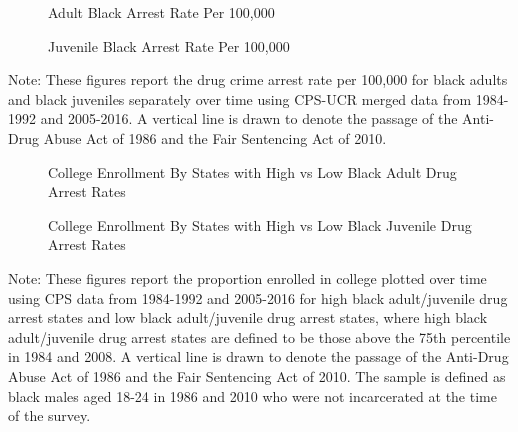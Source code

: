 
   \begin{figure}[h]
    \centering
    \caption{Adult Black Arrest Rate Per 100,000}%
    \qquad
    \label{fig:raw_ab}%
  \end{figure}
  \begin{figure}[h]
    \centering
    \caption{Juvenile Black Arrest Rate Per 100,000}%
    \qquad
    \label{fig:raw_jb}%
  \end{figure}

  \begin{footnotesize}
    \noindent Note: These figures report the drug crime arrest rate per 100,000 for black adults and black juveniles separately over time using CPS-UCR merged data from 1984-1992 and 2005-2016. A vertical line is drawn to denote the passage of the Anti-Drug Abuse Act of 1986 and the Fair Sentencing Act of 2010.
  \end{footnotesize}
  
  \clearpage
  

  \begin{figure}[h]
    \centering
    \caption{College Enrollment By States with High vs Low Black Adult Drug Arrest Rates}%
    \qquad
    \label{fig:raw_college_highlowab_1986}%
  \end{figure}
  \begin{figure}[h]
    \centering
    \caption{College Enrollment By States with High vs Low Black Juvenile Drug Arrest Rates}%
    \qquad
    \label{fig:raw_college_highlowjb_1986}%
  \end{figure}
  
  \begin{footnotesize}
    \noindent Note: These figures report the proportion enrolled in college plotted over time using CPS data from 1984-1992 and 2005-2016 for high black adult/juvenile drug arrest states and low black adult/juvenile drug arrest states, where high black adult/juvenile drug arrest states are defined to be those above the 75th percentile in 1984 and 2008. A vertical line is drawn to denote the passage of the Anti-Drug Abuse Act of 1986 and the Fair Sentencing Act of 2010. The sample is defined as black males aged 18-24 in 1986 and 2010 who were not incarcerated at the time of the survey.
  \end{footnotesize}
  
